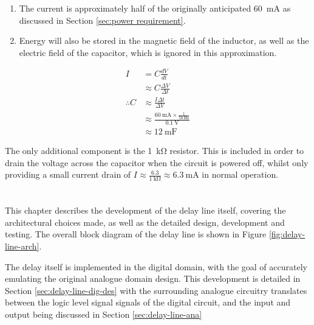 \begin{enumerate}
	\item The current is approximately half of the originally anticipated \SI{60}{\milli\ampere} as discussed in Section \ref{sec:power requirement}.
	\item Energy will also be stored in the magnetic field of the inductor, as well as the electric field of the capacitor, which is ignored in this approximation.
\end{enumerate}

\begin{align}
I &= C \frac{dV}{dt} \nonumber \\
&\approx C \frac{\Delta V}{ \Delta t} \nonumber \\
\therefore C &\approx \frac{I \Delta t}{\Delta V} \nonumber \\
&\approx \frac{\SI{60}{\milli\ampere} \times \frac{1}{\SI{50}{\hertz}} }{\SI{0.1}{\volt}} \nonumber \\
&\approx \SI{12}{\milli\farad} \label{eq:delay-line-ripple}
\end{align}

The only additional component is the \SI{1}{\kilo\ohm} resistor. This is included in order to drain the voltage across the capacitor when the circuit is powered off, whilst only providing a small current drain of $I \approx \frac{6.3}{\SI{1}{\kilo\ohm}} \approx \SI{6.3}{\milli\ampere}$ in normal operation.

\chapter{} \label{sec:delay-line-des}

This chapter describes the development of the delay line itself, covering the architectural choices made, as well as the detailed design, development and testing. The overall block diagram of the delay line is shown in Figure \ref{fig:delay-line-arch}.

The delay itself is implemented in the digital domain, with the goal of accurately emulating the original analogue domain design. This development is detailed in Section \ref{sec:delay-line-dig-des} with the surrounding analogue circuitry translates between the logic level signal signals of the digital circuit, and the input and output being discussed in Section \ref{sec:delay-line-ana}

